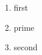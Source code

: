 \documentclass{beamer}
\newlength{\primewidth}
\begin{document}
\begin{frame}
\begin{enumerate}
    \item first
    \item[1'\hskip-\primewidth .] prime
    \item second
\end{enumerate}
\end{frame}
\end{document}
